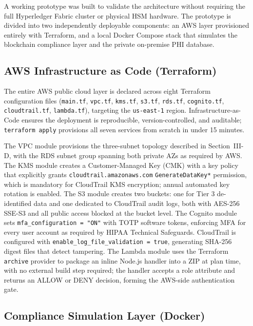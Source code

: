 \documentclass[10pt,twocolumn,a4paper]{article}
\begin{document}
A working prototype was built to validate the architecture without
requiring the full Hyperledger Fabric cluster or physical HSM hardware.
The prototype is divided into two independently deployable components:
an AWS layer provisioned entirely with Terraform, and a local Docker
Compose stack that simulates the blockchain compliance layer and the
private on-premise PHI database.

\subsection{AWS Infrastructure as Code (Terraform)}

The entire AWS public cloud layer is declared across eight Terraform
configuration files (\texttt{main.tf}, \texttt{vpc.tf}, \texttt{kms.tf},
\texttt{s3.tf}, \texttt{rds.tf}, \texttt{cognito.tf},
\texttt{cloudtrail.tf}, \texttt{lambda.tf}), targeting the
\texttt{us-east-1} region. Infrastructure-as-Code ensures the deployment
is reproducible, version-controlled, and auditable; \texttt{terraform apply}
provisions all seven services from scratch in under 15 minutes.

The VPC module provisions the three-subnet topology described in
Section~III-D, with the RDS subnet group spanning both private AZs as
required by AWS. The KMS module creates a Customer-Managed Key (CMK)
with a key policy that explicitly grants \texttt{cloudtrail.amazonaws.com}
\texttt{GenerateDataKey*} permission, which is mandatory for CloudTrail
KMS encryption; annual automated key rotation is enabled. The S3 module
creates two buckets: one for Tier 3 de-identified data and one dedicated
to CloudTrail audit logs, both with AES-256 SSE-S3 and all public access
blocked at the bucket level. The Cognito module sets
\texttt{mfa\_configuration = "ON"} with TOTP software tokens, enforcing
MFA for every user account as required by HIPAA Technical Safeguards.
CloudTrail is configured with \texttt{enable\_log\_file\_validation = true},
generating SHA-256 digest files that detect tampering. The Lambda module
uses the Terraform \texttt{archive} provider to package an inline
Node.js handler into a ZIP at plan time, with no external build step
required; the handler accepts a role attribute and returns an ALLOW or
DENY decision, forming the AWS-side authentication gate.

\subsection{Compliance Simulation Layer (Docker)}
\end{document}
